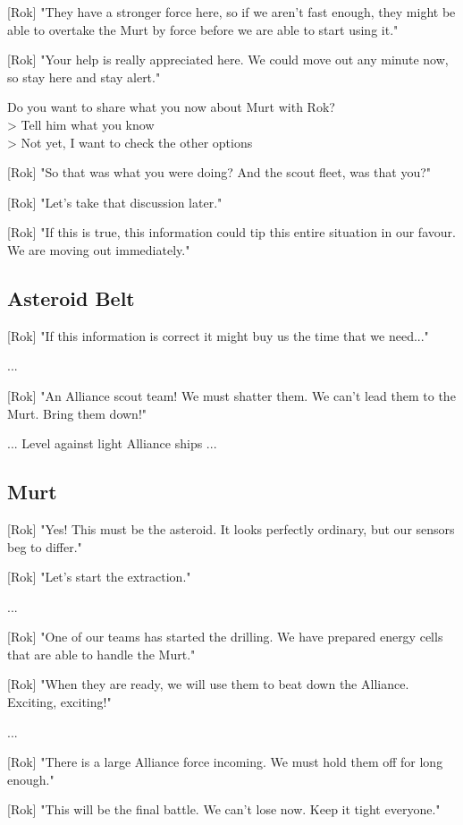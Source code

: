 \documentclass[a4paper,12pt]{article}
\begin{document}
[Rok] "They have a stronger force here, so if we aren't fast enough, they might be able to overtake the Murt by force
before we are able to start using it."

[Rok] "Your help is really appreciated here. We could move out any minute now, so stay here and stay alert."

Do you want to share what you now about Murt with Rok?\\
> Tell him what you know\\
> Not yet, I want to check the other options

[Rok] "So that was what you were doing? And the scout fleet, was that you?"

[Rok] "Let's take that discussion later." 

[Rok] "If this is true, this information could tip this entire situation in our favour. We are moving out immediately."

\subsection{Asteroid Belt}

[Rok] "If this information is correct it might buy us the time that we need..."

...

[Rok] "An Alliance scout team! We must shatter them. We can't lead them to the Murt. Bring them down!"

... Level against light Alliance ships ...

\subsection{Murt}

[Rok] "Yes! This must be the asteroid. It looks perfectly ordinary, but our sensors beg to differ."

[Rok] "Let's start the extraction."

...

[Rok] "One of our teams has started the drilling. We have prepared energy cells that are able to handle the Murt."

[Rok] "When they are ready, we will use them to beat down the Alliance. Exciting, exciting!"

...

[Rok] "There is a large Alliance force incoming. We must hold them off for long enough."

[Rok] "This will be the final battle. We can't lose now. Keep it tight everyone."
\end{document}
